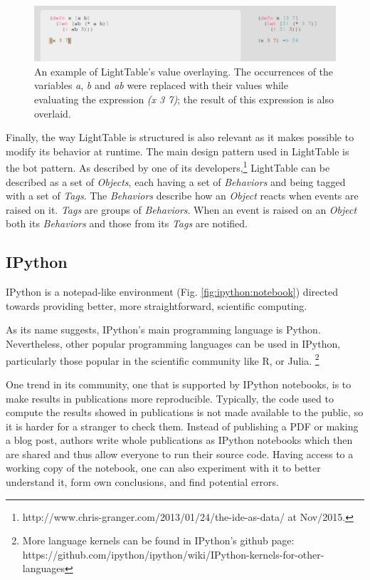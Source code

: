 \begin{figure}
	\centering
	\includegraphics[width=12cm]{./images/lt_val_overlay__inv}
	\caption{An example of LightTable's value overlaying. The occurrences of the variables \emph{a}, \emph{b} and \emph{ab} were replaced with their values while evaluating the expression \emph{(x 3 7)}; the result of this expression is also overlaid.}
	\label{fig:lt:val:overlay}
\end{figure}

Finally, the way LightTable is structured is also relevant as it makes possible to modify its behavior at runtime.
The main design pattern used in LightTable is the \gls{bot} pattern.
As described by one of its developers,\footnote{http://www.chris-granger.com/2013/01/24/the-ide-as-data/ at Nov/2015.} LightTable can be described as a set of \emph{Objects}, each having a set of \emph{Behaviors} and being tagged with a set of \emph{Tags}.
The \emph{Behaviors} describe how an \emph{Object} reacts when events are raised on it. \emph{Tags} are groups of \emph{Behaviors}.
When an event is raised on an \emph{Object} both its \emph{Behaviors} and those from its \emph{Tags} are notified.


\subsection{IPython}
\label{section:ipython:related}
IPython\cite{PER-GRA:2007} is a notepad-like environment (Fig. \ref{fig:ipython:notebook}) directed towards providing better, more straightforward, scientific computing.

As its name suggests, IPython's main programming language is Python.
Nevertheless, other popular programming languages can be used in IPython, particularly those popular in the scientific community like R, or Julia.%
\footnote{More language kernels can be found in IPython's github page: https://github.com/ipython/ipython/wiki/IPython-kernels-for-other-languages}

One trend in its community, one that is supported by IPython notebooks, is to make results in publications more reproducible.
Typically, the code used to compute the results showed in publications is not made available to the public, so it is harder for a stranger to check them.
Instead of publishing a PDF or making a blog post, authors write whole publications as IPython notebooks which then are shared and thus allow everyone to run their source code.
Having access to a working copy of the notebook, one can also experiment with it to better understand it, form own conclusions, and find potential errors.

